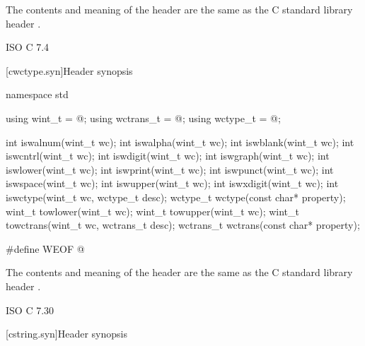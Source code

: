 \pnum
{}%
The contents and meaning of the header 
are the same as the C standard library header .

\xref ISO C 7.4

[cwctype.syn]{Header  synopsis}

%
%
%
%
%
%
%
%
%
%
%
%
%
%
%
%
%
%
%
%
%
%
%
\begin{codeblock}
namespace std {
  using wint_t = @\seebelow@;
  using wctrans_t = @\seebelow@;
  using wctype_t = @\seebelow@;

  int iswalnum(wint_t wc);
  int iswalpha(wint_t wc);
  int iswblank(wint_t wc);
  int iswcntrl(wint_t wc);
  int iswdigit(wint_t wc);
  int iswgraph(wint_t wc);
  int iswlower(wint_t wc);
  int iswprint(wint_t wc);
  int iswpunct(wint_t wc);
  int iswspace(wint_t wc);
  int iswupper(wint_t wc);
  int iswxdigit(wint_t wc);
  int iswctype(wint_t wc, wctype_t desc);
  wctype_t wctype(const char* property);
  wint_t towlower(wint_t wc);
  wint_t towupper(wint_t wc);
  wint_t towctrans(wint_t wc, wctrans_t desc);
  wctrans_t wctrans(const char* property);
}

#define WEOF @\seebelow@
\end{codeblock}

\pnum
{}%
The contents and meaning of the header 
are the same as the C standard library header .

\xref ISO C 7.30

[cstring.syn]{Header  synopsis}

